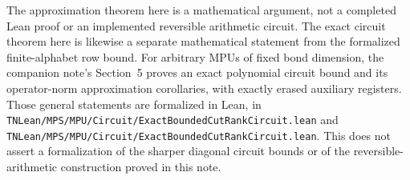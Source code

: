 \documentclass[11pt]{article}
\begin{document}
The approximation theorem here is a mathematical argument, not a completed
Lean proof or an implemented reversible arithmetic circuit. The exact
circuit theorem here is likewise a separate mathematical statement from
the formalized finite-alphabet row bound. For arbitrary MPUs of fixed bond dimension, the
companion note's Section~5 proves an exact polynomial circuit bound and
its operator-norm approximation corollaries, with exactly erased auxiliary
registers. Those general statements are formalized in Lean, in
\nolinkurl{TNLean/MPS/MPU/Circuit/ExactBoundedCutRankCircuit.lean} and
\nolinkurl{TNLean/MPS/MPU/Circuit/ExactBoundedCutRankCircuit.lean}. This does not
assert a formalization of the sharper diagonal circuit bounds or of the
reversible-arithmetic construction proved in this note.
\end{document}
